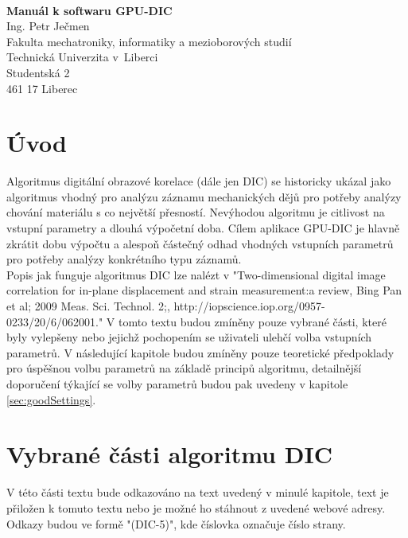 \documentclass[a4paper,12pt]{article}
\date{September 13, 2013}
\begin{document}
\logo
\\\vspace{6pt}
\begin{center}
\large{\bfseries Manuál k softwaru GPU-DIC}
\\\vspace{1pc}
\small{
Ing. Petr Ječmen
\\\vspace{1pc}
Fakulta mechatroniky, informatiky a mezioborových studií\\
Technická Univerzita v~Liberci\\
Studentská 2\\
461 17 Liberec}
\end{center}
\newpage
\tableofcontents
\newpage
\section{Úvod}
Algoritmus digitální obrazové korelace (dále jen DIC) se historicky ukázal jako algoritmus vhodný pro analýzu záznamu mechanických dějů pro potřeby analýzy chování materiálu s co největší přesností. Nevýhodou algoritmu je citlivost na vstupní parametry a dlouhá výpočetní doba. Cílem aplikace GPU-DIC je  hlavně zkrátit dobu výpočtu a alespoň částečný odhad vhodných vstupních parametrů pro potřeby analýzy konkrétního typu záznamů.\\
Popis jak funguje algoritmus DIC lze nalézt v "Two-dimensional digital image correlation for in-plane displacement and strain measurement:a review, Bing Pan et al; 2009 Meas. Sci. Technol. 2;, http://iopscience.iop.org/0957-0233/20/6/062001." V tomto textu budou zmíněny pouze vybrané části, které byly vylepšeny nebo jejichž pochopením se uživateli ulehčí volba vstupních parametrů. V následující kapitole budou zmíněny pouze teoretické předpoklady pro úspěšnou volbu parametrů na základě principů algoritmu, detailnější doporučení týkající se volby parametrů budou pak uvedeny v kapitole \ref{sec:goodSettings}.
\newpage
\section{Vybrané části algoritmu DIC}
V této části textu bude odkazováno na text uvedený v minulé kapitole, text je přiložen k tomuto textu nebo je možné ho stáhnout z uvedené webové adresy. Odkazy budou ve formě "(DIC-5)", kde číslovka označuje číslo strany.
\end{document}
